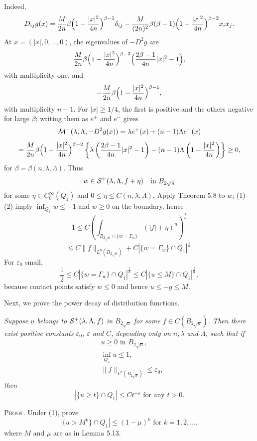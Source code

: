 Indeed,
\[
D_{ij}g(x)=\frac{M}{2n}\beta\Bigl(1-\frac{|x|^2}{4n}\Bigr)^{\beta-1}\delta_{ij}
-\frac{M}{(2n)^2}\beta(\beta-1)\Bigl(1-\frac{|x|^2}{4n}\Bigr)^{\beta-2}x_i x_j.
\]
At $x=(|x|,0,\ldots,0)$, the eigenvalues of $-D^2g$ are
\[
\frac{M}{2n}\beta\Bigl(1-\frac{|x|^2}{4n}\Bigr)^{\beta-2}
\Bigl(\frac{2\beta-1}{4n}|x|^2-1\Bigr),
\]
with multiplicity one, and
\[
-\frac{M}{2n}\beta\Bigl(1-\frac{|x|^2}{4n}\Bigr)^{\beta-1},
\]
with multiplicity $n-1$. For $|x|\ge1/4$, the first is positive and the others negative for large $\beta$; writing them as $e^+$ and $e^-$ gives
\[
\mathcal{M}^-(\lambda,\Lambda,-D^2g(x))=\lambda e^+(x)+(n-1)\Lambda e^-(x)
\]
\[
=\frac{M}{2n}\beta\Bigl(1-\frac{|x|^2}{4n}\Bigr)^{\beta-2}
\left\{\lambda\left(\frac{2\beta-1}{4n}|x|^2-1\right)-(n-1)\Lambda\left(1-\frac{|x|^2}{4n}\right)\right\}\geq 0,
\]
for $\beta=\beta(n,\lambda,\Lambda)$. Thus
\[
 w\in\mathcal{S}^{+}(\lambda,\Lambda,f+\eta) \quad \text{in } B_{2\sqrt n}
\]
for some $\eta\in C_0^\infty(Q_1)$ and $0\leq \eta\leq C(n,\lambda,\Lambda)$.
Apply Theorem 5.8 to $w$; (1)--(2) imply $\inf_{Q_3}w\le-1$ and $w\ge0$ on the boundary, hence
\[
1\leq C\left(\int_{B_{2\sqrt n}\cap\{w=\Gamma_w\}} (|f|+\eta)^n\right)^{\frac1n}
\]
\[
\leq C\|f\|_{L^n(B_{2\sqrt n})}+C|\{w=\Gamma_w\}\cap Q_1|^{\frac1n}.
\]
For $\varepsilon_0$ small,
\[
\frac12\leq C|\{w=\Gamma_w\}\cap Q_1|^{\frac1n}\leq C|\{u\leq M\}\cap Q_1|^{\frac1n},
\]
because contact points satisfy $w\le0$ and hence $u\le-g\le M$.

Next, we prove the power decay of distribution functions.

\begin{lemma}\label{hanlin:ch05-lem-5-14} \textit{Suppose $u$ belongs to $\mathcal{S}^{+}(\lambda,\Lambda,f)$ in $B_{2\sqrt n}$ for some $f\in C(B_{2\sqrt n})$.
Then there exist positive constants $\varepsilon_0$, $\varepsilon$ and $C$, depending only on $n,\lambda$ and $\Lambda$, such
that if}
\[
\tag{1}
\begin{aligned}
&u\geq 0 \text{ in } B_{2\sqrt n},\\
&\inf_{Q_3} u\leq 1,\\
&\|f\|_{L^n(B_{2\sqrt n})}\leq \varepsilon_0,
\end{aligned}
\]
\textit{then}
\[
|\{u\geq t\}\cap Q_1|\leq Ct^{-\varepsilon}\text{ for any } t>0.
\]
\end{lemma}


\textsc{Proof.} \sketch Under (1), prove
\begin{equation}\tag{2}
\left|\{u>M^k\}\cap Q_1\right|\leq (1-\mu)^k \text{ for } k=1,2,\ldots,
\end{equation}
where $M$ and $\mu$ are as in Lemma 5.13.

